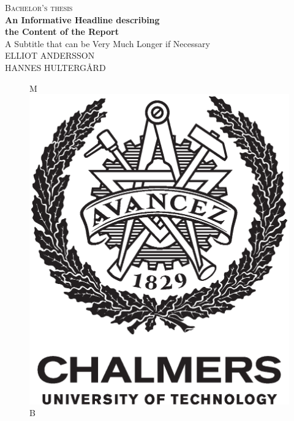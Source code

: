 \newpage
\restoregeometry
\thispagestyle{empty}
\mbox{}


\newpage
\thispagestyle{empty}
\begin{center}
	\textsc{\large Bachelor's thesis \the\year}\\[4cm]
	\textbf{\Large An Informative Headline describing\\ the Content of the Report} \\[1cm]
	{\large A Subtitle that can be Very Much Longer if Necessary}\\[1cm]
	{\large ELLIOT ANDERSSON}\\
	{\large HANNES HULTERGÅRD}
	
	\vfill	
	\begin{figure}[H]
	\centering
	\if\ThesisType M
    \includegraphics[width=0.2\pdfpagewidth]{figure/auxiliary/AvancezChalmersU_black_centered.eps} \\
    \fi
    \if\ThesisType B

\end{figure}
\end{center}
